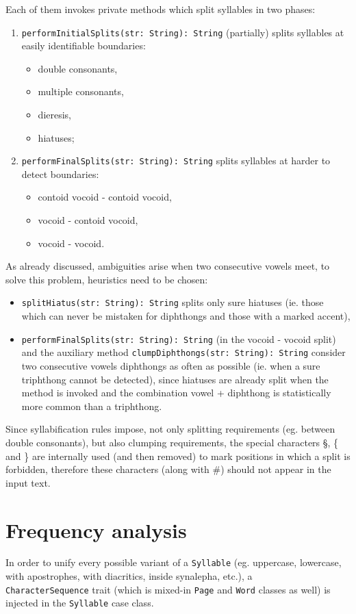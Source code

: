 Each of them invokes private methods which split syllables in two phases:
\begin{enumerate}
	\item \texttt{performInitialSplits(str: String): String} (partially) splits syllables at easily identifiable boundaries:
	\begin{itemize}
		\item double consonants,
		\item multiple consonants,
		\item dieresis,
		\item hiatuses;
	\end{itemize}
	\item \texttt{performFinalSplits(str: String): String} splits syllables at harder to detect boundaries:
	\begin{itemize}
		\item contoid vocoid - contoid vocoid,
		\item vocoid - contoid vocoid,
		\item vocoid - vocoid.
	\end{itemize}
\end{enumerate}

As already discussed, ambiguities arise when two consecutive vowels meet, to solve this problem, heuristics need to be chosen:
\begin{itemize}
	\item \texttt{splitHiatus(str: String): String} splits only sure hiatuses (ie. those which can never be mistaken for diphthongs and those with a marked accent),
	\item \texttt{performFinalSplits(str: String): String} (in the vocoid - vocoid split) and the auxiliary method \texttt{clumpDiphthongs(str: String): String} consider two consecutive vowels diphthongs as often as possible (ie. when a sure triphthong cannot be detected), since hiatuses are already split when the method is invoked and the combination vowel + diphthong is statistically more common than a triphthong.
\end{itemize}

Since syllabification rules impose, not only splitting requirements (eg. between double consonants), but also clumping requirements, the special characters §, \{ and \} are internally used (and then removed) to mark positions in which a split is forbidden, therefore these characters (along with $\#$) should not appear in the input text.


\section{Frequency analysis}
In order to unify every possible variant of a \texttt{Syllable} (eg. uppercase, lowercase, with apostrophes, with diacritics, inside synalepha, etc.), a\\ \texttt{CharacterSequence} trait (which is mixed-in \texttt{Page} and \texttt{Word} classes as well) is injected in the \texttt{Syllable} case class.

